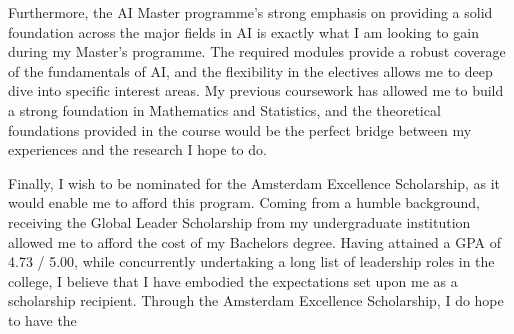 \documentclass[11pt, a4paper]{awesome-cv}
\begin{document}
\begin{cvletter}
  Furthermore, the AI Master programme’s strong emphasis on providing a solid
  foundation across the major fields in AI is exactly what I am looking to gain
  during my Master’s programme. The required modules provide a robust coverage
  of the fundamentals of AI, and the flexibility in the electives allows me to
  deep dive into specific interest areas. My previous coursework has allowed me
  to build a strong foundation in Mathematics and Statistics, and the
  theoretical foundations provided in the course would be the perfect bridge
  between my experiences and the research I hope to do.

  Finally, I wish to be nominated for the Amsterdam Excellence Scholarship, as
  it would enable me to afford this program. Coming from a humble background,
  receiving the Global Leader Scholarship from my undergraduate institution
  allowed me to afford the cost of my Bachelors degree. Having attained a GPA of
  4.73 / 5.00, while concurrently undertaking a long list of leadership roles in
  the college, I believe that I have embodied the expectations set upon me as a
  scholarship recipient. Through the Amsterdam Excellence Scholarship, I do hope
  to have the

\end{cvletter}


\makeletterclosing
\end{document}

